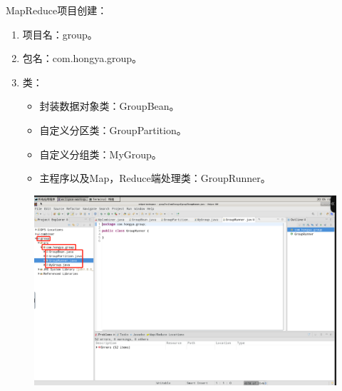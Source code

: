 \documentclass {article}
\begin{document}
				MapReduce项目创建：
				\begin{enumerate}
					\item 项目名：group。
					\item 包名：com.hongya.group。
					\item 类：
					\begin{itemize}
						\item 封装数据对象类：GroupBean。
						\item 自定义分区类：GroupPartition。
						\item 自定义分组类：MyGroup。
						\item 主程序以及Map，Reduce端处理类：GroupRunner。
					\end{itemize}
				\end{enumerate}
				\begin{figure}[H]
					\centering
					\includegraphics[width=4.5in]{figures/fig19.jpg}
				\end{figure}
			
\end{document}

